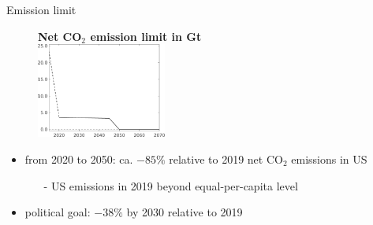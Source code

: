 \documentclass[11pt,aspectratio=169]{beamer}
\newcommand{\ar}{$\Rightarrow$ \ }
\begin{document}
		\begin{frame}{Emission limit}
			\vspace{-3mm}
			\begin{center}
				\begin{figure}
					\centering
					\textbf{Net CO$_2$ emission limit in Gt}\\
					\vspace{2mm}	\includegraphics[width=0.38\textwidth]{../codding_model/own_basedOnFried/optimalPol_010922_revision/figures/all_13Sept22_Tplus30/Emnet.png}
				\end{figure}
			\end{center}
			\pause
			
			\begin{itemize}
				\item<+-> from 2020 to 2050: ca. $-85\%$ relative to 2019 net CO$_2$ emissions in US
				\vspace{2mm}
				\begin{itemize}
					\item[-] US emissions in 2019 beyond equal-per-capita level
				\end{itemize}
				\vspace{2mm}
				\item<+-> political goal: $-38\%$ by 2030 relative to 2019
			\end{itemize}
		\end{frame}
		
\end{document}

